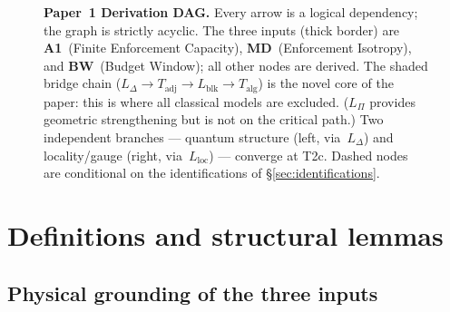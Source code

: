 \documentclass[11pt]{article}
\theoremstyle{remark}
\begin{document}
\begin{figure}[p]
\caption[Paper~1 Derivation DAG]{%
\textbf{Paper~1 Derivation DAG.}
Every arrow is a logical dependency; the graph is strictly acyclic.
The three inputs (thick border) are
\textbf{A1}~(Finite Enforcement Capacity),
\textbf{MD}~(Enforcement Isotropy),
and \textbf{BW}~(Budget Window); all other nodes are derived.
The shaded bridge chain ($L_\Delta \to T_{\mathrm{adj}} \to L_{\mathrm{blk}} \to T_{\mathrm{alg}}$) is the novel core of the paper: this is where all classical models are excluded.  ($L_\Pi$ provides geometric strengthening but is not on the critical path.)
Two independent branches --- quantum structure (left, via~$L_\Delta$) and locality/gauge (right, via~$L_{\mathrm{loc}}$) --- converge at T2c.
Dashed nodes are conditional on the identifications of \S\ref{sec:identifications}.
}
\label{fig:dag}
\end{figure}
\clearpage


\section{Definitions and structural lemmas}
\label{sec:defs}

\subsection{Physical grounding of the three inputs}
\label{sec:input_grounding}
\end{document}
